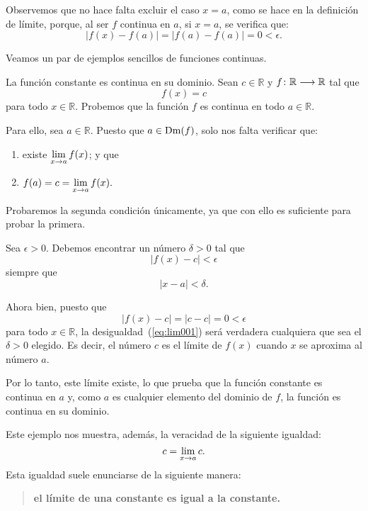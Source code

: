 Observemos que no hace falta excluir el caso $x = a$, como se hace en la definición de límite,
porque, al ser $f$ continua en $a$, si $x = a$, se verifica que:
\[
|f(x) - f(a)| = |f(a) - f(a)| = 0 < \epsilon.
\]

Veamos un par de ejemplos sencillos de funciones continuas.

\begin{exemplo}[Solución]{\label{ex:lim002}
La función constante es continua en su dominio.}%
Sean $c\in\mathbb{R}$ y $\funcjc{f}{\mathbb{R}}{\mathbb{R}}$ tal que
\[
f(x) = c
\]
para todo $x\in \mathbb{R}$. Probemos que la función $f$ es continua en todo $a\in\mathbb{R}$.

Para ello, sea $a\in\mathbb{R}$. Puesto que $a\in\Dm(f)$, solo nos falta verificar que:
\begin{enumerate}
\item existe $\displaystyle\limjc{f(x)}{x}{a}$; y que
\item $\displaystyle f(a) = c = \limjc{f(x)}{x}{a}.$
\end{enumerate}
Probaremos la segunda condición únicamente, ya que con ello es suficiente para probar la primera.

Sea $\epsilon > 0$. Debemos encontrar un número $\delta > 0$ tal que
\begin{equation}
\label{eq:lim001}
|f(x) - c| < \epsilon
\end{equation}
siempre que
\[
|x - a| < \delta.
\]

Ahora bien, puesto que
\[
|f(x) - c| = |c - c| = 0 < \epsilon
\]
para todo $x\in\mathbb{R}$, la desigualdad~(\ref{eq:lim001}) será verdadera cualquiera que sea el
$\delta > 0$ elegido. Es decir, el número $c$ es el límite de $f(x)$ cuando $x$ se aproxima al
número $a$.

Por lo tanto, este límite existe, lo que prueba que la función constante es continua en $a$ y, como
$a$ es cualquier elemento del dominio de $f$, la función es continua en su dominio.
\end{exemplo}

Este ejemplo nos muestra, además, la veracidad de la siguiente igualdad:
\begin{equation}
\label{eq:LimConstante}
c = \limjc{c}{x}{a}.
\end{equation}
Esta igualdad suele enunciarse de la siguiente manera:
\begin{quote}
\textbf{el límite de una constante es igual a la constante.}
\end{quote}


